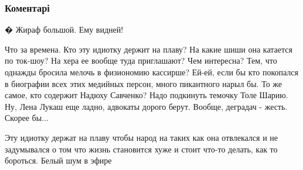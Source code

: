  
 
 
 
 
\subsubsection{Коментарі}

\begin{itemize}
 
� Жираф большой. Ему видней!

 

Что за времена. Кто эту идиотку держит на плаву? На какие шиши она катается по
ток-шоу? На хера ее вообще туда приглашают? Чем интересна? Тем, что однажды
бросила мелочь в физиономию кассирше? Ей-ей, если бы кто покопался в биографии
всех этих медийных персон, много пикантного нарыл бы. То же самое, кто содержит
Надюху Савченко? Надо подкинуть темочку Толе Шарию. Ну, Лена Лукаш еще ладно,
адвокаты дорого берут. Вообще, деградач - жесть. Скорее бы...

\begin{itemize}
 

Эту идиотку держат на плаву чтобы народ на таких как она отвлекался и не
задумывался о том что жизнь становится хуже и стоит что-то делать, как то
бороться. Белый шум в эфире


 

\end{itemize}
\end{itemize}
